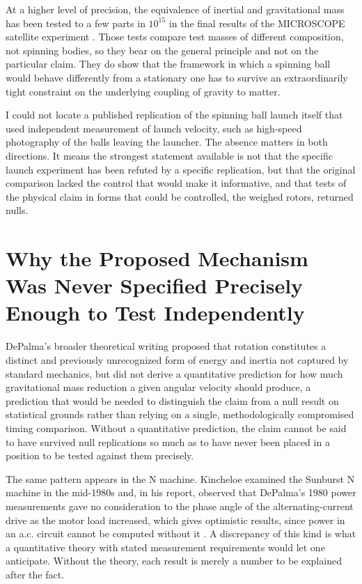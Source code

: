\documentclass[11pt]{article}
\begin{document}
At a higher level of precision, the equivalence of inertial and gravitational mass has been tested to a few parts in $10^{15}$ in the final results of the MICROSCOPE satellite experiment \cite{T2022}. Those tests compare test masses of different composition, not spinning bodies, so they bear on the general principle and not on the particular claim. They do show that the framework in which a spinning ball would behave differently from a stationary one has to survive an extraordinarily tight constraint on the underlying coupling of gravity to matter.

I could not locate a published replication of the spinning ball launch itself that used independent measurement of launch velocity, such as high-speed photography of the balls leaving the launcher. The absence matters in both directions. It means the strongest statement available is not that the specific launch experiment has been refuted by a specific replication, but that the original comparison lacked the control that would make it informative, and that tests of the physical claim in forms that could be controlled, the weighed rotors, returned nulls.

\section{Why the Proposed Mechanism Was Never Specified Precisely Enough to Test Independently}

DePalma's broader theoretical writing proposed that rotation constitutes a distinct and previously unrecognized form of energy and inertia not captured by standard mechanics, but did not derive a quantitative prediction for how much gravitational mass reduction a given angular velocity should produce, a prediction that would be needed to distinguish the claim from a null result on statistical grounds rather than relying on a single, methodologically compromised timing comparison. Without a quantitative prediction, the claim cannot be said to have survived null replications so much as to have never been placed in a position to be tested against them precisely.

The same pattern appears in the N machine. Kincheloe examined the Sunburst N machine in the mid-1980s and, in his report, observed that DePalma's 1980 power measurements gave no consideration to the phase angle of the alternating-current drive as the motor load increased, which gives optimistic results, since power in an a.c. circuit cannot be computed without it \cite{K1986}. A discrepancy of this kind is what a quantitative theory with stated measurement requirements would let one anticipate. Without the theory, each result is merely a number to be explained after the fact.
\end{document}
